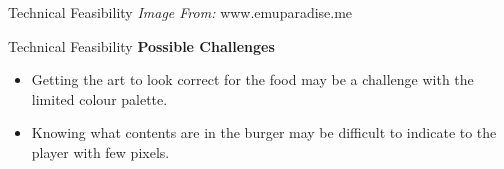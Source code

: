 \documentclass{beamer}
\begin{document}
\begin{frame}{Technical Feasibility}
    \textit{Image From:} www.emuparadise.me
\end{frame}

\begin{frame}{Technical Feasibility}		
 \textbf{Possible Challenges} \pause
		\begin{itemize}
			\item Getting the art to look correct for the food may be a challenge with the limited colour palette. \pause
			\item Knowing what contents are in the burger may be difficult to indicate to the player with few pixels. 	
		\end{itemize}
\end{frame}
\end{document}
